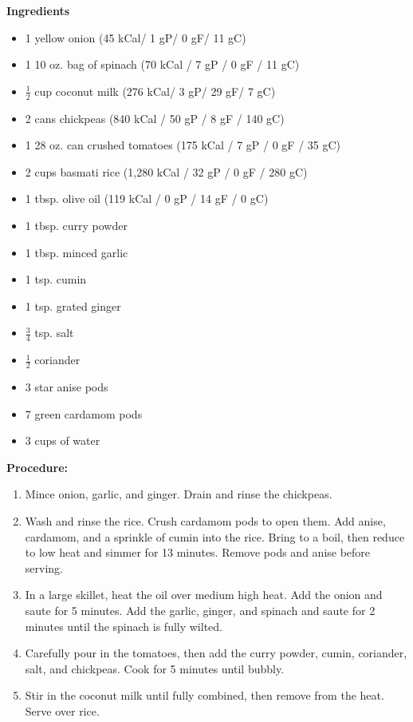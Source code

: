 \documentclass{report}
\begin{document}


\bigskip

\bigskip

\begin{multicols}{2}
\textbf{Ingredients}
\begin{itemize}
\item 1 yellow onion \quad (45 kCal/ 1 gP/ 0 gF/ 11 gC)
\item 1 10 oz. bag of spinach \newline(70 kCal / 7 gP / 0 gF / 11 gC)
\item $\frac{1}{2}$ cup coconut milk \quad (276 kCal/ 3 gP/ 29 gF/ 7 gC)
\item 2 cans chickpeas \quad (840 kCal / 50 gP / 8 gF / 140 gC)
\item 1 28 oz. can crushed tomatoes \newline (175 kCal / 7 gP / 0 gF / 35 gC)
\item 2 cups basmati rice \quad (1,280 kCal / 32 gP / 0 gF / 280 gC)
\item 1 tbsp. olive oil \quad (119 kCal / 0 gP / 14 gF / 0 gC)
\item 1 tbsp. curry powder
\item 1 tbsp. minced garlic
\item 1 tsp. cumin
\item 1 tsp. grated ginger
\item $\frac{3}{4}$ tsp. salt 
\item $\frac{1}{2}$ coriander
\item 3 star anise pods
\item 7 green cardamom pods
\item 3 cups of water 


\end{itemize}


\columnbreak
\textbf{Procedure:}
\medskip


\begin{enumerate}
\item Mince onion, garlic, and ginger. Drain and rinse the chickpeas. 
\item Wash and rinse the rice. Crush cardamom pods to open them. Add anise, cardamom, and a sprinkle of cumin into the rice. Bring to a boil, then reduce to low heat and simmer for 13 minutes. Remove pods and anise before serving. 
\item In a large skillet, heat the oil over medium high heat. Add the onion and saute for 5 minutes. Add the garlic, ginger, and spinach and saute for 2 minutes until the spinach is fully wilted.
\item Carefully pour in the tomatoes, then add the curry powder, cumin, coriander, salt, and chickpeas. Cook for 5 minutes until bubbly.
\item Stir in the coconut milk until fully combined, then remove from the heat. Serve over rice.




\end{enumerate}
\end{multicols}
\end{document}
